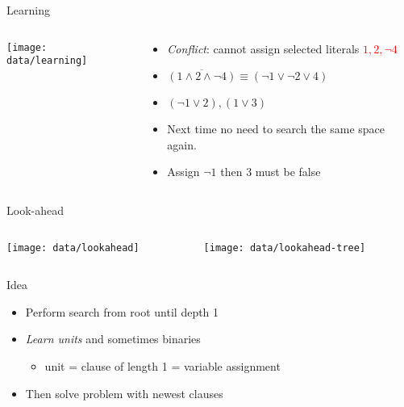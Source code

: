 \documentclass[mathserif,serif]{beamer}
\begin{document}
\begin{frame}{Learning}
  \begin{columns}[t]
    \begin{column}[T]{0.5\textwidth}
      \centering
      \texttt{[image: data/learning]}
    \end{column}

    \begin{column}[T]{0.6\textwidth}
      \begin{itemize}
        \item \emph{Conflict}: cannot assign selected literals \textcolor{red}{$1, 2, \neg 4$}
        \item $\overline{(1 \land 2 \land \neg 4)} \equiv (\neg 1 \lor \neg 2 \lor 4)$
        \item $(\neg 1 \lor 2), (1 \lor 3)$
        \item Next time no need to search the same space again.
        \item Assign $\neg 1$ then $3$ must be false
      \end{itemize}
    \end{column}
  \end{columns}
\end{frame}

\begin{frame}{Look-ahead}
  \begin{columns}[t]
    \begin{column}[T]{0.4\textwidth}
      \texttt{[image: data/lookahead]}
    \end{column}

    \begin{column}[T]{0.7\textwidth}
      \texttt{[image: data/lookahead-tree]}
    \end{column}
  \end{columns}

  \begin{block}{Idea}
    \begin{itemize}
      \item Perform search from root until depth 1
      \item \emph{Learn units} and sometimes binaries
      \begin{itemize}
        \item unit = clause of length 1 = variable assignment
      \end{itemize}
      \item Then solve problem with newest clauses
    \end{itemize}
  \end{block}

\end{frame}
\end{document}
